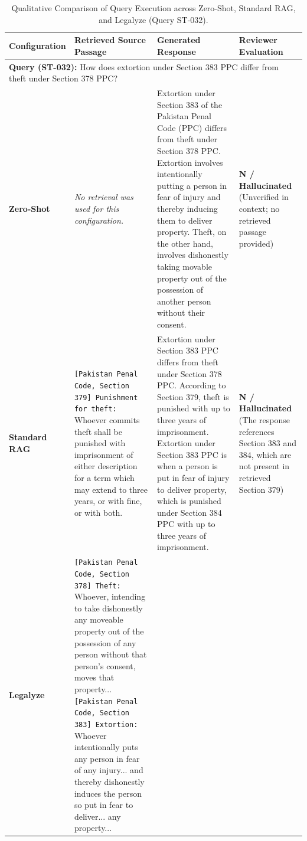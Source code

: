 \documentclass[11pt]{article}
\begin{document}
\vspace*{1cm}
\setcounter{table}{3}

\begin{table}[H]
\caption{Qualitative Comparison of Query Execution across Zero-Shot, Standard RAG, and Legalyze (Query ST-032).}
\label{tab:sample_comparison}
\centering
\small
\begin{tabularx}{\textwidth}{|l|>{\raggedright\arraybackslash\hsize=1.1\hsize}X|>{\raggedright\arraybackslash\hsize=1.1\hsize}X|>{\raggedright\arraybackslash\hsize=0.8\hsize}X|}
\hline
\textbf{Configuration} & \textbf{Retrieved Source Passage} & \textbf{Generated Response} & \textbf{Reviewer Evaluation} \\ \hline
\multicolumn{4}{|l|}{\textbf{Query (ST-032):} How does extortion under Section 383 PPC differ from theft under Section 378 PPC?} \\ \hline
\textbf{Zero-Shot} & 
\emph{No retrieval was used for this configuration.} & 
Extortion under Section 383 of the Pakistan Penal Code (PPC) differs from theft under Section 378 PPC. Extortion involves intentionally putting a person in fear of injury and thereby inducing them to deliver property. Theft, on the other hand, involves dishonestly taking movable property out of the possession of another person without their consent. & 
\textbf{N / Hallucinated} \newline (Unverified in context; no retrieved passage provided) \\ \hline
\textbf{Standard RAG} & 
\texttt{[Pakistan Penal Code, Section 379] Punishment for theft:} Whoever commits theft shall be punished with imprisonment of either description for a term which may extend to three years, or with fine, or with both. & 
Extortion under Section 383 PPC differs from theft under Section 378 PPC. According to Section 379, theft is punished with up to three years of imprisonment. Extortion under Section 383 PPC is when a person is put in fear of injury to deliver property, which is punished under Section 384 PPC with up to three years of imprisonment. & 
\textbf{N / Hallucinated} \newline (The response references Section 383 and 384, which are not present in retrieved Section 379) \\ \hline
\textbf{Legalyze} & 
\texttt{[Pakistan Penal Code, Section 378] Theft:} Whoever, intending to take dishonestly any moveable property out of the possession of any person without that person's consent, moves that property... \newline
\texttt{[Pakistan Penal Code, Section 383] Extortion:} Whoever intentionally puts any person in fear of any injury... and thereby dishonestly induces the person so put in fear to deliver... any property... & 

\end{tabularx}
\end{table}
\end{document}
